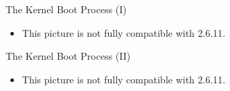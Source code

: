 \begin{frame}{The Kernel Boot Process (I)}
  \begin{center}
  \end{center}
\end{frame}

\begin{itemize}
\item This picture is not fully compatible with 2.6.11.
\end{itemize}

\begin{frame}{The Kernel Boot Process (II)}
  \begin{center}
  \end{center}
\end{frame}

\begin{itemize}
\item This picture is not fully compatible with 2.6.11.
\end{itemize}


%     
%     
%     


